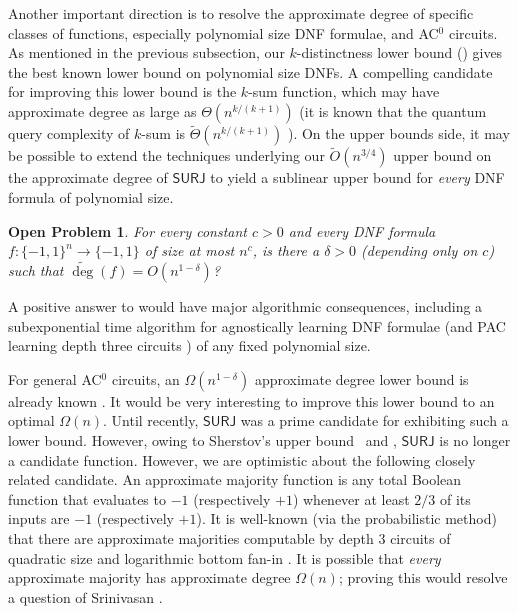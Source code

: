 \documentclass[11pt, letterpaper, fleqn]{article}
\newtheorem{openproblem}[theorem]{Open Problem}
\theoremstyle{plain}
\newcommand{\SURJ}{\mathsf{ SURJ}}
\newcommand{\bits}{\{-1,1\}}
\newcommand{\adeg}{\widetilde{\operatorname{deg}}}
\begin{document}
Another important direction is to resolve
the approximate degree of specific classes of functions, especially polynomial
size DNF formulae, and AC$^0$ circuits. 
As mentioned in the previous subsection, our $k$-distinctness lower bound () gives the best known lower bound on polynomial size DNFs. A compelling candidate for improving this lower bound is the $k$-sum function, which may have approximate degree as large as $\Theta(n^{k/(k+1)})$ (it is known that the quantum query complexity of $k$-sum is $\tilde{\Theta}(n^{k/(k+1)})$ \cite{ambainis, belovsspalek}). On the upper bounds side, it may be possible to extend the techniques underlying our $\tilde{O}(n^{3/4})$ upper bound on the approximate degree of $\SURJ$ to yield a sublinear upper bound for \emph{every} DNF formula of polynomial size. 

\begin{openproblem} \label{op4} For every constant $c>0$ and every DNF formula $f\colon \bits^n \to \bits$ of size at most $n^c$,
is there a $\delta > 0$ (depending only on $c$) such that $\adeg(f) = O(n^{1-\delta})$? \end{openproblem}

A positive answer to  
would have major algorithmic consequences, including a subexponential time algorithm for agnostically learning
DNF formulae \cite{kkms} (and PAC learning depth three circuits \cite{ksdnf}) of any fixed polynomial size. 

For general AC$^0$ circuits, an $\Omega(n^{1-\delta})$ approximate degree lower bound is already known \cite{adegsurj}. 
It would be very interesting to improve this lower bound to an optimal $\Omega(n)$.
Until recently, $\SURJ$ was a prime candidate for exhibiting such a lower bound. However, owing to Sherstov's upper bound~\cite{sherstovpersonal} and ,
$\textsf{SURJ}$ is no longer a candidate function. 
However, we are optimistic about the following closely related candidate. An approximate majority
function is any total Boolean function that evaluates to $-1$ (respectively $+1$) whenever at least $2/3$ of its 
inputs are $-1$ (respectively $+1$). 
It is well-known (via the probabilistic method) that there are approximate majorities computable by depth 3 circuits 
of quadratic size and logarithmic bottom fan-in \cite{ajtai}. 
It is possible that \emph{every} approximate majority has approximate degree $\Omega(n)$;
proving this would resolve a question of Srinivasan \cite{filmus2014real}. 

\end{document}
